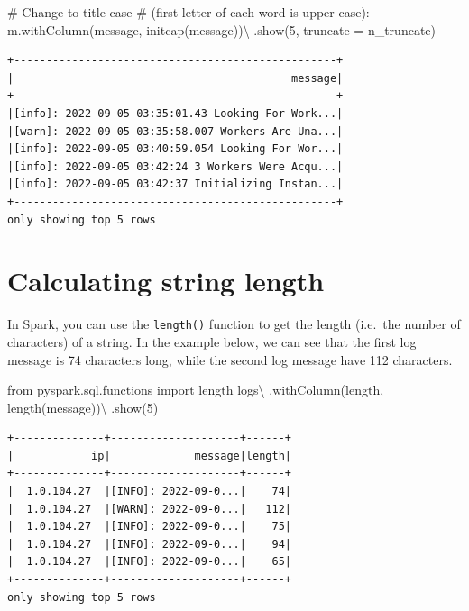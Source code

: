 \documentclass[
  11pt,
  letterpaper,
  DIV=11,
  numbers=noendperiod]{scrreprt}
\newenvironment{Shaded}{\begin{snugshade}}{\end{snugshade}}
\newcommand{\CommentTok}[1]{\textcolor[rgb]{0.37,0.37,0.37}{#1}}
\newcommand{\DecValTok}[1]{\textcolor[rgb]{0.68,0.00,0.00}{#1}}
\newcommand{\ImportTok}[1]{\textcolor[rgb]{0.00,0.46,0.62}{#1}}
\newcommand{\NormalTok}[1]{\textcolor[rgb]{0.00,0.23,0.31}{#1}}
\newcommand{\OperatorTok}[1]{\textcolor[rgb]{0.37,0.37,0.37}{#1}}
\newcommand{\StringTok}[1]{\textcolor[rgb]{0.13,0.47,0.30}{#1}}
\begin{document}
\begin{Shaded}
\begin{Highlighting}[]
\CommentTok{\# Change to title case}
\CommentTok{\# (first letter of each word is upper case):}
\NormalTok{m.withColumn(}\StringTok{\textquotesingle{}message\textquotesingle{}}\NormalTok{, initcap(}\StringTok{\textquotesingle{}message\textquotesingle{}}\NormalTok{))}\OperatorTok{\textbackslash{}}
\NormalTok{    .show(}\DecValTok{5}\NormalTok{, truncate }\OperatorTok{=}\NormalTok{ n\_truncate)}
\end{Highlighting}
\end{Shaded}

\begin{verbatim}
+--------------------------------------------------+
|                                           message|
+--------------------------------------------------+
|[info]: 2022-09-05 03:35:01.43 Looking For Work...|
|[warn]: 2022-09-05 03:35:58.007 Workers Are Una...|
|[info]: 2022-09-05 03:40:59.054 Looking For Wor...|
|[info]: 2022-09-05 03:42:24 3 Workers Were Acqu...|
|[info]: 2022-09-05 03:42:37 Initializing Instan...|
+--------------------------------------------------+
only showing top 5 rows
\end{verbatim}

\hypertarget{calculating-string-length}{%
\section{Calculating string length}\label{calculating-string-length}}

In Spark, you can use the \texttt{length()} function to get the length
(i.e.~the number of characters) of a string. In the example below, we
can see that the first log message is 74 characters long, while the
second log message have 112 characters.

\begin{Shaded}
\begin{Highlighting}[]
\ImportTok{from}\NormalTok{ pyspark.sql.functions }\ImportTok{import}\NormalTok{ length}
\NormalTok{logs}\OperatorTok{\textbackslash{}}
\NormalTok{    .withColumn(}\StringTok{\textquotesingle{}length\textquotesingle{}}\NormalTok{, length(}\StringTok{\textquotesingle{}message\textquotesingle{}}\NormalTok{))}\OperatorTok{\textbackslash{}}
\NormalTok{    .show(}\DecValTok{5}\NormalTok{)}
\end{Highlighting}
\end{Shaded}

\begin{verbatim}
+--------------+--------------------+------+
|            ip|             message|length|
+--------------+--------------------+------+
|  1.0.104.27  |[INFO]: 2022-09-0...|    74|
|  1.0.104.27  |[WARN]: 2022-09-0...|   112|
|  1.0.104.27  |[INFO]: 2022-09-0...|    75|
|  1.0.104.27  |[INFO]: 2022-09-0...|    94|
|  1.0.104.27  |[INFO]: 2022-09-0...|    65|
+--------------+--------------------+------+
only showing top 5 rows
\end{verbatim}
\end{document}

